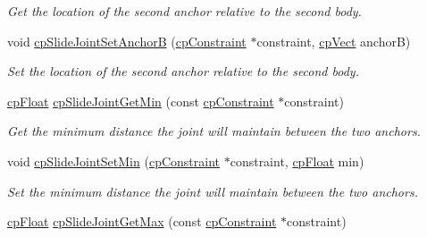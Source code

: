 \begin{DoxyCompactItemize}
\begin{DoxyCompactList}\small\item\em Get the location of the second anchor relative to the second body. \end{DoxyCompactList}\item 
\hypertarget{group__cp_slide_joint_gac82b09530a9e046303b757f192a46b02}{}void \hyperlink{group__cp_slide_joint_gac82b09530a9e046303b757f192a46b02}{cp\+Slide\+Joint\+Set\+Anchor\+B} (\hyperlink{structcp_constraint}{cp\+Constraint} $\ast$constraint, \hyperlink{structcp_vect}{cp\+Vect} anchor\+B)\label{group__cp_slide_joint_gac82b09530a9e046303b757f192a46b02}

\begin{DoxyCompactList}\small\item\em Set the location of the second anchor relative to the second body. \end{DoxyCompactList}\item 
\hypertarget{group__cp_slide_joint_gafbb077b4522f09aec309e1f39ed14c8a}{}\hyperlink{group__basic_types_gac1ed65573e035bf892505768c852d8d3}{cp\+Float} \hyperlink{group__cp_slide_joint_gafbb077b4522f09aec309e1f39ed14c8a}{cp\+Slide\+Joint\+Get\+Min} (const \hyperlink{structcp_constraint}{cp\+Constraint} $\ast$constraint)\label{group__cp_slide_joint_gafbb077b4522f09aec309e1f39ed14c8a}

\begin{DoxyCompactList}\small\item\em Get the minimum distance the joint will maintain between the two anchors. \end{DoxyCompactList}\item 
\hypertarget{group__cp_slide_joint_gae7baa242e8a7e7d530dce383c4c39bcb}{}void \hyperlink{group__cp_slide_joint_gae7baa242e8a7e7d530dce383c4c39bcb}{cp\+Slide\+Joint\+Set\+Min} (\hyperlink{structcp_constraint}{cp\+Constraint} $\ast$constraint, \hyperlink{group__basic_types_gac1ed65573e035bf892505768c852d8d3}{cp\+Float} min)\label{group__cp_slide_joint_gae7baa242e8a7e7d530dce383c4c39bcb}

\begin{DoxyCompactList}\small\item\em Set the minimum distance the joint will maintain between the two anchors. \end{DoxyCompactList}\item 
\hypertarget{group__cp_slide_joint_ga2a0be8c404481a192e5580288a5677f1}{}\hyperlink{group__basic_types_gac1ed65573e035bf892505768c852d8d3}{cp\+Float} \hyperlink{group__cp_slide_joint_ga2a0be8c404481a192e5580288a5677f1}{cp\+Slide\+Joint\+Get\+Max} (const \hyperlink{structcp_constraint}{cp\+Constraint} $\ast$constraint)\label{group__cp_slide_joint_ga2a0be8c404481a192e5580288a5677f1}


\end{DoxyCompactItemize}
